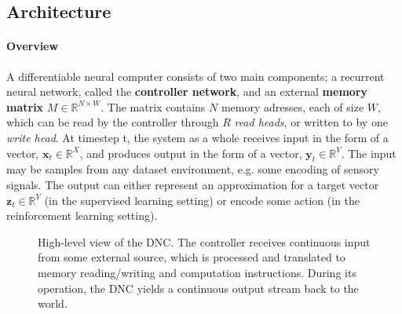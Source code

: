 \documentclass[]{article}
\begin{document}
\subsection{Architecture}
\paragraph{Overview} 
A differentiable neural computer consists of two main components; a recurrent neural network, called the \textbf{controller network}, and an external \textbf{memory matrix} $M \in \mathbb{R}^{N\times W}$. The matrix contains $N$ memory adresses, each of size $W$, which can be read by the controller through $R$ \textit{read heads}, or written to by one \textit{write head}. At timestep t, the system as a whole receives input in the form of a vector, $\pmb{x}_t \in \mathbb{R}^X$, and produces output in the form of a vector, $\pmb{y}_t \in \mathbb{R}^Y$. The input may be samples from any dataset environment, e.g. some encoding of sensory signals. The output can either represent an approximation for a target vector $\pmb{z}_t \in \mathbb{R}^Y$ (in the supervised learning setting) or encode some action (in the reinforcement learning setting).

\begin{figure}
	\centering
	\caption[]
	{\small \textit{}\label{fig:3} High-level view of the DNC. The controller receives continuous input from some external source, which is processed and translated to memory reading/writing and computation instructions. During its operation, the DNC yields a continuous output stream back to the world.}
\end{figure}
\end{document}
